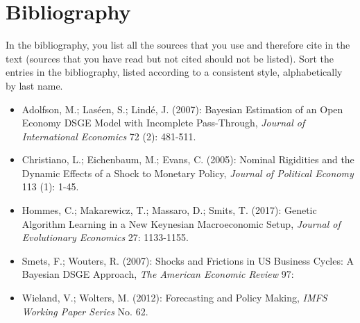 \documentclass[11pt,a4paper]{article}
\begin{document}
\section*{Bibliography}
In the bibliography, you list all the sources that you use and therefore cite in the text (sources that you have read but not cited should not be listed). Sort the entries in the bibliography, listed according to a consistent style, alphabetically by last name.
\begin{itemize}
	\item[] Adolfson, M.; Las\'een, S.; Lind\'e, J. (2007): Bayesian Estimation of an Open Economy DSGE Model with Incomplete Pass-Through, \textit{Journal of International Economics} 72 (2): 481-511.
 \item[] Christiano, L.; Eichenbaum, M.; Evans, C. (2005): Nominal Rigidities and the Dynamic Effects of a Shock to Monetary Policy, \textit{Journal of Political Economy} 113 (1): 1-45.
 \item[] Hommes, C.; Makarewicz, T.; Massaro, D.; Smits, T. (2017): Genetic Algorithm Learning in a New Keynesian Macroeconomic Setup, \textit{Journal of Evolutionary Economics} 27: 1133-1155.
	\item[] Smets, F.; Wouters, R. (2007): Shocks and Frictions in US Business Cycles: A Bayesian DSGE Approach, \textit{The American Economic Review} 97: 
	\item[] Wieland, V.; Wolters, M. (2012): Forecasting and Policy Making, \textit{IMFS Working Paper Series} No. 62.
\end{itemize}


\newpage
\end{document}
